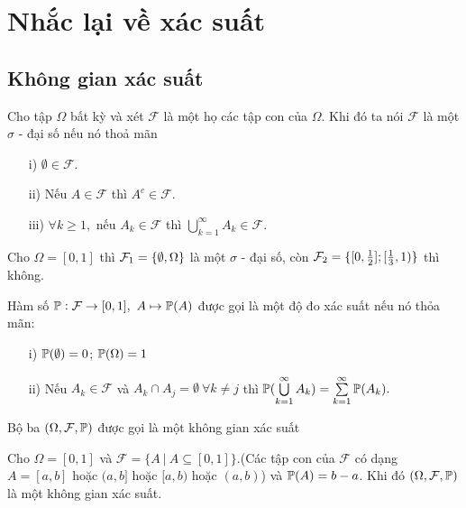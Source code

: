 \chapter{Nhắc lại về xác suất}
\section{Không gian xác suất}
\begin{defn}
Cho tập $\Omega$  bất kỳ và xét  $\mathcal{F}$ là một họ các tập con của $\Omega$. Khi đó ta nói $\mathcal{F}$ là một $\sigma$ - đại số nếu nó thoả mãn
\begin{itemize}
\item[i)]$\emptyset \in \mathcal{F}.$
\item[ii)] Nếu $A \in \mathcal{F}$ thì $A^c \in \mathcal{F}.$
\item[iii)] $\forall k \geq 1,$ nếu $A_k \in \mathcal{F}$ thì $\bigcup\limits_{k = 1}^{\infty} A_k \in \mathcal{F}.$ 
\end{itemize}
\end{defn}
\begin{exam*}
Cho $\Omega = [0, 1]$ thì $\mathcal{F}_1=\{\emptyset, \Omega\}$ là một $\sigma$ - đại số, còn $\mathcal{F}_2 = \{[0, \frac{1}{2}]; [\frac{1}{3}, 1)\}$ thì không.
\end{exam*}
\begin{defn} Hàm số $\mathbb{P}: \mathcal{F} \to [0,1],~A \mapsto \mathbb{P}(A)$ được gọi là một độ đo xác suất nếu nó thỏa mãn:
\begin{itemize}
\item[i)]$\mathbb{P}(\emptyset) = 0$; $\mathbb{P}(\Omega) = 1$
\item[ii)] Nếu $A_k \in \mathcal{F}$ và $A_k \cap A_j = \emptyset~\forall k \neq j$ thì $\mathbb{P}(\bigcup\limits_{k = 1}^{\infty} A_k) = \sum\limits_{k = 1}^{\infty}\mathbb{P}(A_k).$
\end{itemize}
\end{defn}
\begin{defn} Bộ ba $(\Omega, \mathcal{F}, \mathbb{P})$ được gọi là một không gian xác suất
\end{defn}
\begin{exam*}
Cho $\Omega = [0,1]$ và $\mathcal{F} = \{A~|~A \subseteq [0, 1]\}$.(Các tập con của $\mathcal{F}$ có dạng $A = [a, b]$ hoặc $(a, b]$ hoặc $[a, b)$ hoặc $(a, b)$) và $\mathbb{P}(A) = b - a$. Khi đó $(\Omega, \mathcal{F}, \mathbb{P})$ là một không gian xác suất.
\end{exam*}
